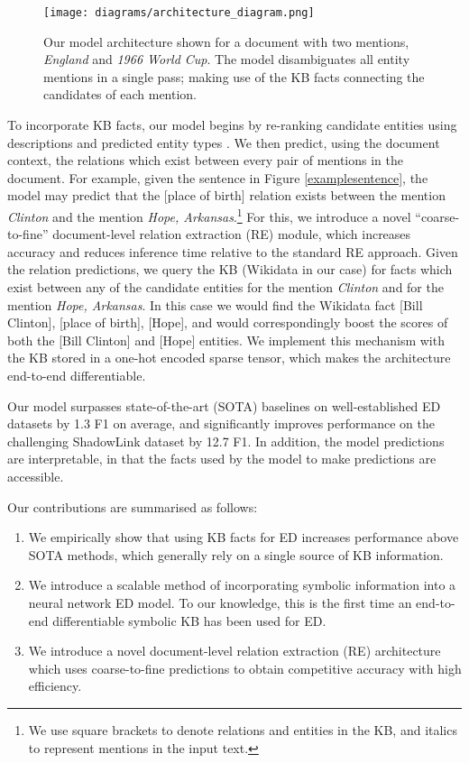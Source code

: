 \documentclass[11pt]{article}
\begin{document}
\begin{figure*}[htp]
    \centering
    \texttt{[image: diagrams/architecture\_diagram.png]}
    \caption{Our model architecture shown for a document with two mentions, \emph{England} and \emph{1966 World Cup}. The model disambiguates all entity mentions in a single pass; making use of the KB facts connecting the candidates of each mention.}
    \label{modeldiagram}
\end{figure*}


To incorporate KB facts, our model begins by re-ranking candidate entities using descriptions \cite{blink} and predicted entity types \cite{Raiman2018DeepTypeME}. We then predict, using the document context, the relations which exist between every pair of mentions in the document. For example, given the sentence in Figure \ref{examplesentence}, the model may predict that the [place of birth] relation exists between the mention \emph{Clinton} and the mention \emph{Hope, Arkansas}.\footnote{We use square brackets to denote relations and entities in the KB, and italics to represent mentions in the input text.} For this, we introduce a novel ``coarse-to-fine'' document-level relation extraction (RE) module, which increases accuracy and reduces inference time relative to the standard RE approach. Given the relation predictions, we query the KB (Wikidata in our case) for facts which exist between any of the candidate entities for the mention \emph{Clinton} and for the mention \emph{Hope, Arkansas}. In this case we would find the Wikidata fact [Bill Clinton], [place of birth], [Hope], and would correspondingly boost the scores of both the [Bill Clinton] and [Hope] entities. 
We implement this mechanism with the KB stored in a one-hot encoded sparse tensor, which makes the architecture end-to-end differentiable.




Our model surpasses state-of-the-art (SOTA) baselines on well-established ED datasets by 1.3 F1 on average, and significantly improves performance on the challenging ShadowLink dataset by 12.7 F1. In addition, the model predictions are interpretable, in that the facts used by the model to make predictions are accessible. 







Our contributions are summarised as follows:
\begin{enumerate}
    \item We empirically show that using KB facts for ED increases performance above SOTA methods, which generally rely on a single source of KB information.
    \item We introduce a scalable method of incorporating symbolic information into a neural network ED model. To our knowledge, this is the first time an end-to-end differentiable symbolic KB has been used for ED.
\item  We introduce a novel document-level relation extraction (RE) architecture which uses coarse-to-fine predictions to obtain competitive accuracy with high efficiency.  \end{enumerate}
\end{document}

